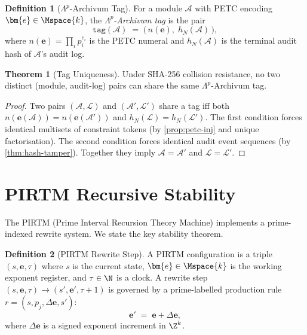 \documentclass[12pt,letterpaper]{article}
\theoremstyle{definition}
\newtheorem{definition}{Definition}[section]
\newtheorem{theorem}{Theorem}[section]
\theoremstyle{remark}
\begin{document}
\begin{definition}[\(\Lambda^p\)-Archivum Tag]
  \label{def:lambda-tag}
  For a module \(\mathcal{A}\) with PETC encoding \(\bm{e} \in \Mspace{k}\),
  the \emph{\(\Lambda^p\)-Archivum tag} is the pair
  \[
    \mathtt{tag}(\mathcal{A}) \;=\; \bigl(\,n(\bm{e}),\; h_N(\mathcal{A})\,\bigr),
  \]
  where \(n(\bm{e}) = \prod_i p_i^{e_i}\) is the PETC numeral and
  \(h_N(\mathcal{A})\) is the terminal audit hash of \(\mathcal{A}\)'s
  audit log.
\end{definition}

\begin{theorem}[Tag Uniqueness]
  \label{thm:tag-unique}
  Under SHA-256 collision resistance, no two distinct (module, audit-log)
  pairs can share the same \(\Lambda^p\)-Archivum tag.
\end{theorem}

\begin{proof}
  Two pairs \((\mathcal{A}, \mathcal{L})\) and \((\mathcal{A}', \mathcal{L}')\)
  share a tag iff both \(n(\bm{e}(\mathcal{A})) = n(\bm{e}(\mathcal{A}'))\)
  and \(h_N(\mathcal{L}) = h_N(\mathcal{L}')\).
  The first condition forces identical multisets of constraint tokens
  (by \cref{prop:petc-inj} and unique factorisation).
  The second condition forces identical audit event sequences (by
  \cref{thm:hash-tamper}).  Together they imply
  \(\mathcal{A} = \mathcal{A}'\) and \(\mathcal{L} = \mathcal{L}'\).
\end{proof}

\section{PIRTM Recursive Stability}
\label{sec:pirtm}

The PIRTM (Prime Interval Recursion Theory Machine) implements a
prime-indexed rewrite system.  We state the key stability theorem.

\begin{definition}[PIRTM Rewrite Step]
  \label{def:pirtm-step}
  A PIRTM configuration is a triple \((s, \bm{e}, \tau)\) where
  \(s\) is the current state, \(\bm{e} \in \Mspace{k}\) is the working
  exponent register, and \(\tau \in \N\) is a clock.  A rewrite step
  \((s, \bm{e}, \tau) \to (s', \bm{e}', \tau+1)\) is governed by
  a prime-labelled production rule \(r = (s, p_j, \Delta\bm{e}, s')\):
  \[
    \bm{e}' \;=\; \bm{e} + \Delta\bm{e},
  \]
  where \(\Delta\bm{e}\) is a signed exponent increment in \(\Z^k\).
\end{definition}
\end{document}
